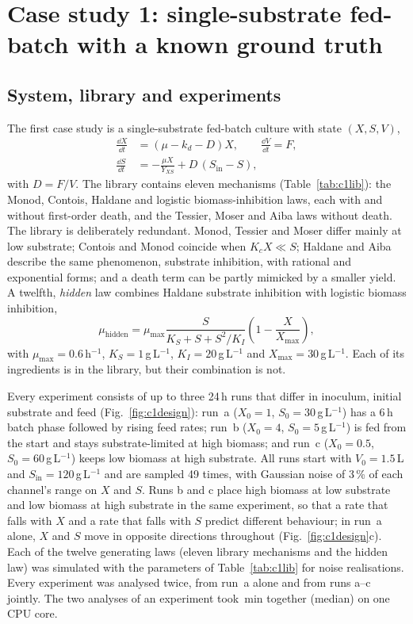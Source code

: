 \section{Case study 1: single-substrate fed-batch with a known ground truth}\label{sec:case1}

\subsection{System, library and experiments}\label{sec:c1:system}
The first case study is a single-substrate fed-batch culture with state $(X,S,V)$,
\begin{equation}
\begin{aligned}
\frac{\dd X}{\dd t} &= (\mu - k_d - D)X, \qquad \frac{\dd V}{\dd t} = F,\\
\frac{\dd S}{\dd t} &= -\frac{\mu X}{Y_{XS}} + D\,(S_{\mathrm{in}}-S),
\end{aligned}
\label{eq:c1}
\end{equation}
with $D=F/V$. The library contains eleven mechanisms (Table~\ref{tab:c1lib}): the Monod, Contois, Haldane and logistic biomass-inhibition laws, each with and without first-order death, and the Tessier, Moser and Aiba laws without death. The library is deliberately redundant. Monod, Tessier and Moser differ mainly at low substrate; Contois and Monod coincide when $K_cX\ll S$; Haldane and Aiba describe the same phenomenon, substrate inhibition, with rational and exponential forms; and a death term can be partly mimicked by a smaller yield. A twelfth, \emph{hidden} law combines Haldane substrate inhibition with logistic biomass inhibition,
\begin{equation}
\mu_{\mathrm{hidden}} = \mu_{\max}\frac{S}{K_S + S + S^2/K_I}\left(1-\frac{X}{X_{\max}}\right),
\label{eq:hidden}
\end{equation}
with $\mu_{\max}=0.6$\,h$^{-1}$, $K_S=1$\,g\,L$^{-1}$, $K_I=20$\,g\,L$^{-1}$ and $X_{\max}=30$\,g\,L$^{-1}$. Each of its ingredients is in the library, but their combination is not.

Every experiment consists of up to three 24\,h runs that differ in inoculum, initial substrate and feed (Fig.~\ref{fig:c1design}): run~a ($X_0=1$, $S_0=30$\,g\,L$^{-1}$) has a 6\,h batch phase followed by rising feed rates; run~b ($X_0=4$, $S_0=5$\,g\,L$^{-1}$) is fed from the start and stays substrate-limited at high biomass; and run~c ($X_0=0.5$, $S_0=60$\,g\,L$^{-1}$) keeps low biomass at high substrate. All runs start with $V_0=1.5$\,L and $S_{\mathrm{in}}=120$\,g\,L$^{-1}$ and are sampled 49 times, with Gaussian noise of 3\,\% of each channel's range on $X$ and $S$. Runs b and c place high biomass at low substrate and low biomass at high substrate in the same experiment, so that a rate that falls with $X$ and a rate that falls with $S$ predict different behaviour; in run~a alone, $X$ and $S$ move in opposite directions throughout (Fig.~\ref{fig:c1design}c). Each of the twelve generating laws (eleven library mechanisms and the hidden law) was simulated with the parameters of Table~\ref{tab:c1lib} for \ConeSeeds{} noise realisations. Every experiment was analysed twice, from run~a alone and from runs a--c jointly. The two analyses of an experiment took \ConeMinutes{}\,min together (median) on one CPU core.

